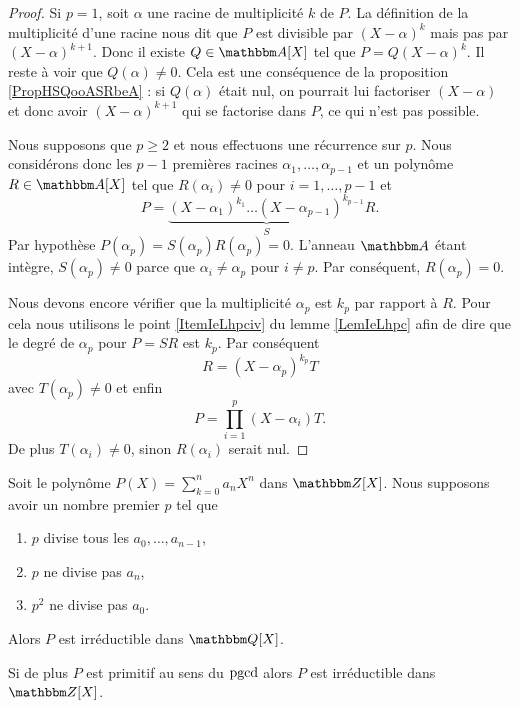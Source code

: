 \begin{proof}
    Si \( p=1\), soit \( \alpha\) une racine de multiplicité \( k\) de \( P\). La définition de la multiplicité d'une racine nous dit que \( P\) est divisible par \( (X-\alpha)^k\) mais pas par \( (X-\alpha)^{k+1}\). Donc il existe \( Q\in \eA[X]\) tel que \( P=Q(X-\alpha)^k\). Il reste à voir que \( Q(\alpha)\neq 0\). Cela est une conséquence de la proposition \ref{PropHSQooASRbeA} : si \( Q(\alpha)\) était nul, on pourrait lui factoriser \( (X-\alpha)\) et donc avoir \( (X-\alpha)^{k+1}\) qui se factorise dans \( P\), ce qui n'est pas possible.

    Nous supposons que \( p\geq 2\) et nous effectuons une récurrence sur \( p\). Nous considérons donc les \( p-1\) premières racines \( \alpha_1,\ldots, \alpha_{p-1}\) et un polynôme \( R\in\eA[X]\) tel que \( R(\alpha_i)\neq 0\) pour \( i=1,\ldots, p-1\) et
    \begin{equation}
        P=\underbrace{(X-\alpha_1)^{k_1}\ldots (X-\alpha_{p-1})^{k_{p-1}}}_SR.
    \end{equation}
    Par hypothèse \( P(\alpha_p)=S(\alpha_p)R(\alpha_p)=0\). L'anneau \( \eA\) étant intègre, \( S(\alpha_p)\neq 0\) parce que \( \alpha_i\neq \alpha_p\) pour \( i\neq p\). Par conséquent, \( R(\alpha_p)=0\).
    
    Nous devons encore vérifier que la multiplicité \( \alpha_p\) est \( k_p\) par rapport à \( R\). Pour cela nous utilisons le point \ref{ItemIeLhpciv} du lemme \ref{LemIeLhpc} afin de dire que le degré de \( \alpha_p\) pour \( P=SR\) est \( k_p\). Par conséquent
    \begin{equation}
        R=(X-\alpha_p)^{k_p}T
    \end{equation}
    avec \( T(\alpha_p)\neq 0\) et enfin
    \begin{equation}
        P=\prod_{i=1}^p(X-\alpha_i)T.
    \end{equation}
    De plus \( T(\alpha_i)\neq 0\), sinon \( R(\alpha_i)\) serait nul.
\end{proof}

\begin{proposition}
    Soit le polynôme \( P(X)=\sum_{k=0}^n a_nX^n\) dans \( \eZ[X]\). Nous supposons avoir un nombre premier \( p\) tel que
    \begin{enumerate}
        \item
            \( p\) divise tous les \( a_0,\ldots, a_{n-1}\),
        \item
            \( p\) ne divise pas \( a_n\),
        \item
            \( p^2\) ne divise pas \( a_0\).
    \end{enumerate}
    Alors \( P\) est irréductible dans \( \eQ[X]\).

    Si de plus \( P\) est primitif au sens du \( \operatorname{pgcd}\) alors \( P\) est irréductible dans \( \eZ[X]\).
\end{proposition}

